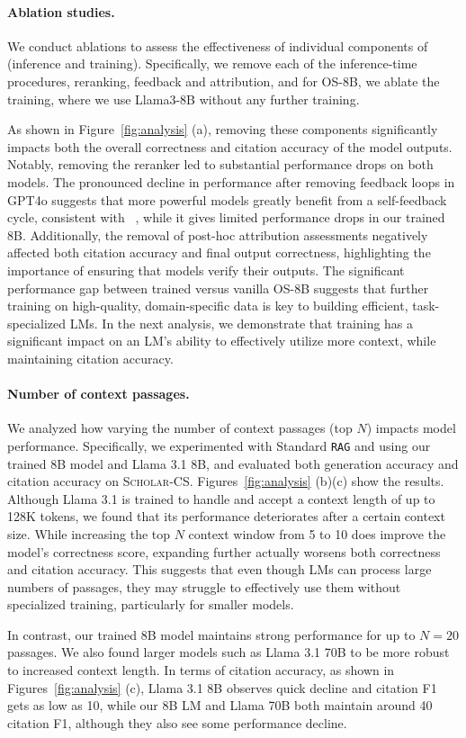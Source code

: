 \paragraph{Ablation studies.}
We conduct ablations to assess the effectiveness of individual components of \model (inference and training). Specifically, we remove each of the inference-time procedures, reranking, feedback and attribution, and for OS-8B, we ablate the training, where we use Llama3-8B without any further training.  

As shown in Figure~\ref{fig:analysis} (a), removing these components significantly impacts both the overall correctness and citation accuracy of the model outputs. Notably, removing the reranker led to substantial performance drops on both models. 
The pronounced decline in performance after removing feedback loops in  GPT4o suggests that more powerful models greatly benefit from a self-feedback cycle, consistent with ~\citet{madaan2023self}, while it gives limited performance drops in our trained 8B.  Additionally, the removal of post-hoc attribution assessments negatively affected both citation accuracy and final output correctness, highlighting the importance of ensuring that models verify their outputs. 
The significant performance gap between trained versus vanilla OS-8B suggests that further training on high-quality, domain-specific data is key to building efficient, task-specialized LMs. 
In the next analysis, we demonstrate that training has a significant impact on an LM's ability to effectively utilize more context, while maintaining citation accuracy. 

\paragraph{Number of context passages.}
We analyzed how varying the number of context passages  (top $N$) impacts model performance. 
Specifically, we experimented with Standard \texttt{RAG} and \model using our trained 8B model and Llama 3.1 8B, and evaluated both generation accuracy and citation accuracy on \textsc{Scholar-CS}. 
Figures~\ref{fig:analysis} (b)(c) show the results.
Although Llama 3.1 is trained to handle and accept a context length of up to 128K tokens, we found that its performance deteriorates after a certain context size. While increasing the top $N$ context window from 5 to 10 does improve the model’s correctness score, expanding further actually worsens both correctness and citation accuracy. This suggests that even though LMs can process large numbers of passages, they may struggle to effectively use them without specialized training, particularly for smaller models. 

In contrast, our trained 8B model maintains strong performance for up to $N=20$ passages. 
We also found larger models such as Llama 3.1 70B to be more robust to increased context length. 
In terms of citation accuracy, as shown in Figures~\ref{fig:analysis} (c), Llama 3.1 8B observes quick decline and citation F1 gets as low as 10, while our 8B LM and Llama 70B both maintain around 40 citation F1, although they also see some performance decline. 